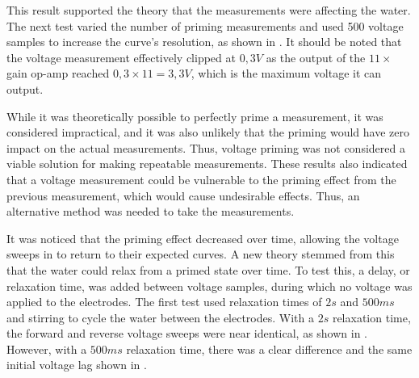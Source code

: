 This result supported the theory that the measurements were affecting the water.
The next test varied the number of priming measurements and used 500 voltage samples to increase the curve's resolution, as shown in .
It should be noted that the voltage measurement effectively clipped at $0,3V$ as the output of the $11\times$ gain op-amp reached $0,3\times 11 = 3,3V$, which is the maximum voltage it can output.

While it was theoretically possible to perfectly prime a measurement, it was considered impractical, and it was also unlikely that the priming would have zero impact on the actual measurements.
Thus, voltage priming was not considered a viable solution for making repeatable measurements.
These results also indicated that a voltage measurement could be vulnerable to the priming effect from the previous measurement, which would cause undesirable effects.
Thus, an alternative method was needed to take the measurements.

It was noticed that the priming effect decreased over time, allowing the voltage sweeps in  to return to their expected curves.
A new theory stemmed from this that the water could relax from a primed state over time.
To test this, a delay, or relaxation time, was added between voltage samples, during which no voltage was applied to the electrodes.
The first test used relaxation times of $2s$ and $500ms$ and stirring to cycle the water between the electrodes.
With a $2s$ relaxation time, the forward and reverse voltage sweeps were near identical, as shown in .
However, with a $500ms$ relaxation time, there was a clear difference and the same initial voltage lag shown in .

